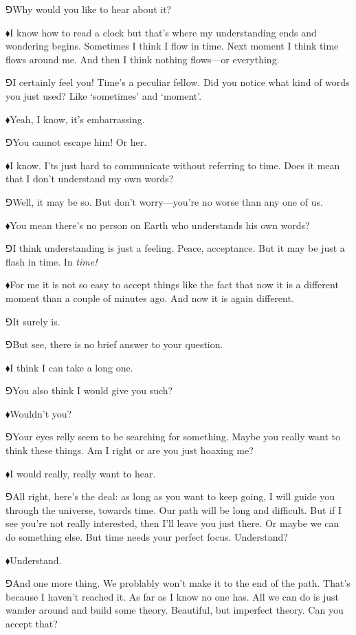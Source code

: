 \documentclass[11pt,oneside%
]{memoir}
\newcommand{\hea}{\(\blacklozenge\)\;}
\newcommand{\heb}{\(\Game\)\;}
\begin{document}
\heb Why would you like to hear about it?

\hea I know how to read a clock but that's where my understanding ends and wondering begins. Sometimes I think I flow in time. Next moment I think time flows around me. And then I think nothing flows---or everything.

\heb I certainly feel you! Time's a peculiar fellow. Did you notice what kind of words you just used? Like `sometimes' and `moment'.

\hea Yeah, I know, it's embarrassing.

\heb You cannot escape him! Or her.

\hea I know. I'ts just hard to communicate without referring to time. Does it mean that I don't understand my own words?

\heb Well, it may be so. But don't worry---you're no worse than any one of us.

\hea You mean there's no person on Earth who understands his own words?

\heb I think understanding is just a feeling. Peace, acceptance. But it may be just a flash in time. In \emph{time!}

\hea For me it is not so easy to accept things like the fact that now it is a different moment than a couple of minutes ago. And now it is again different.

\heb It surely is.

\heb But see, there is no brief answer to your question.

\hea I think I can take a long one.

\heb You also think I would give you such?

\hea Wouldn't you?

\heb Your eyes relly seem to be searching for something. Maybe you really want to think these things. Am I right or are you just hoaxing me?

\hea I would really, really want to hear.

\heb All right, here's the deal: as long as you want to keep going, I will guide you through the universe, towards time. Our path will be long and difficult. But if I see you're not really interested, then I'll leave you just there. Or maybe we can do something else. But time needs your perfect focus. Understand?

\hea Understand.

\heb And one more thing. We problably won't make it to the end of the path. That's because I haven't reached it. As far as I know no one has. All we can do is just wander around and build some theory. Beautiful, but imperfect theory. Can you accept that?
\end{document}
